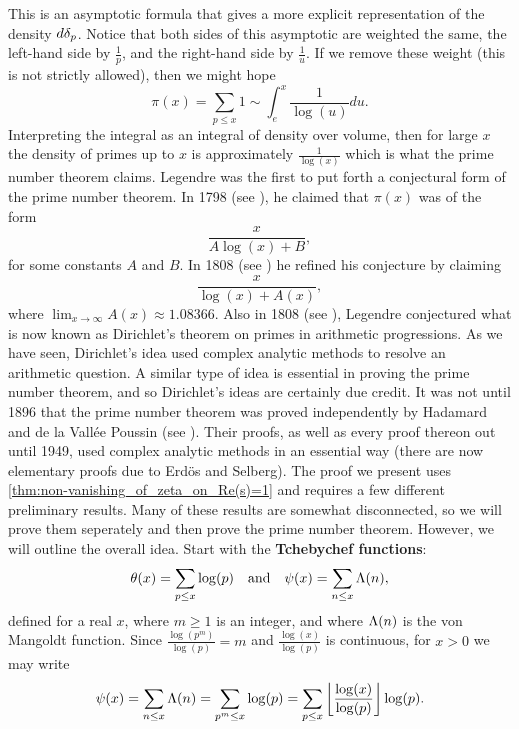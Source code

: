       This is an asymptotic formula that gives a more explicit representation of the density $d\delta_{p}$. Notice that both sides of this asymptotic are weighted the same, the left-hand side by $\frac{1}{p}$, and the right-hand side by $\frac{1}{u}$. If we remove these weight (this is not strictly allowed), then we might hope
      \[
        \pi(x) = \sum_{p \le x}1 \sim \int_{e}^{x}\frac{1}{\log(u)}du.
      \]
      Interpreting the integral as an integral of density over volume, then for large $x$ the density of primes up to $x$ is approximately $\frac{1}{\log(x)}$ which is what the prime number theorem claims. Legendre was the first to put forth a conjectural form of the prime number theorem. In 1798 (see \cite{legendreessai}), he claimed that $\pi(x)$ was of the form
      \[
        \frac{x}{A\log(x)+B},
      \]
      for some constants $A$ and $B$. In 1808 (see \cite{legendre1808essai}) he refined his conjecture by claiming
      \[
        \frac{x}{\log(x)+A(x)},
      \]
      where $\lim_{x \to \infty}A(x) \approx 1.08366$. Also in 1808 (see \cite{legendre1808essai}), Legendre conjectured what is now known as Dirichlet's theorem on primes in arithmetic progressions. As we have seen, Dirichlet's idea used complex analytic methods to resolve an arithmetic question. A similar type of idea is essential in proving the prime number theorem, and so Dirichlet's ideas are certainly due credit. It was not until 1896 that the prime number theorem was proved independently by Hadamard and de la Vall\'ee Poussin (see \cite{hadamard1896distribution,poussin1897recherches}). Their proofs, as well as every proof thereon out until 1949, used complex analytic methods in an essential way (there are now elementary proofs due to Erd\"os and Selberg). The proof we present uses \cref{thm:non-vanishing_of_zeta_on_Re(s)=1} and requires a few different preliminary results. Many of these results are somewhat disconnected, so we will prove them seperately and then prove the prime number theorem. However, we will outline the overall idea. Start with the \textbf{Tchebychef functions}:
      \[
        \theta(x) = \sum_{p \le x}\log(p) \quad \text{and} \quad \psi(x) = \sum_{n \le x}\Lambda(n),
      \]
      defined for a real $x$, where $m \ge 1$ is an integer, and where $\Lambda(n)$ is the von Mangoldt function. Since $\frac{\log(p^{m})}{\log(p)} = m$ and $\frac{\log(x)}{\log(p)}$ is continuous, for $x > 0$ we may write
      \begin{equation}\label{equ:alternative_form_for_Tchebychef function}
        \psi(x) = \sum_{n \le x}\Lambda(n) = \sum_{p^{m} \le x}\log(p) = \sum_{p \le x}\left\lfloor\frac{\log(x)}{\log(p)}\right\rfloor\log(p).
      \end{equation}
